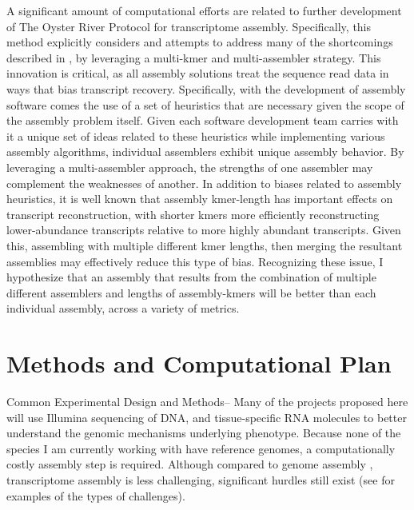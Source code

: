 \documentclass[10.5pt]{article}
\begin{document}
{A significant amount of computational efforts are related to further development of The Oyster River Protocol \citep{MacManes:2015iz} for transcriptome assembly. Specifically, this method explicitly considers and attempts to address many of the shortcomings described in \citep{Vijay:2012gy}, by leveraging a multi-kmer and multi-assembler strategy. This innovation is critical, as all assembly solutions treat the sequence read data in ways that bias transcript recovery. Specifically, with the development of assembly software comes the use of a set of heuristics that are necessary given the scope of the assembly problem itself. Given each software development team carries with it a unique set of ideas related to these heuristics while implementing various assembly algorithms, individual assemblers exhibit unique assembly behavior. By leveraging a multi-assembler approach, the strengths of one assembler may complement the weaknesses of another. In addition to biases related to assembly heuristics, it is well known that assembly kmer-length has important effects on transcript reconstruction, with shorter kmers more efficiently reconstructing lower-abundance transcripts relative to more highly abundant transcripts. Given this, assembling with multiple different kmer lengths, then merging the resultant assemblies may effectively reduce this type of bias. Recognizing these issue, I hypothesize that an assembly that results from the combination of multiple different assemblers and lengths of assembly-kmers will be better than each individual assembly, across a variety of metrics. 

\section*{Methods and Computational Plan}

Common Experimental Design and Methods-- Many of the projects proposed here will use Illumina sequencing of DNA, and tissue-specific RNA molecules to better understand the genomic mechanisms underlying phenotype.  Because none of the species I am currently working with have reference genomes, a computationally costly assembly step is required. Although compared to genome assembly \citep{Bradnam:2013uu,Earl:2011gt}, transcriptome assembly is less challenging, significant hurdles still exist (see \cite{Francis:2013gc,Vijay:2012gy,Pyrkosz:2013tm} for examples of the types of challenges). \\

}
\end{document}
